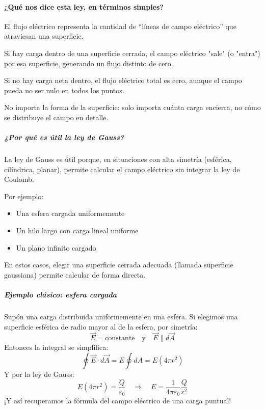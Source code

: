 \paragraph{¿Qué nos dice esta ley, en términos simples?}

El flujo eléctrico representa la cantidad de ``líneas de campo eléctrico'' que atraviesan una superficie.

Si hay carga dentro de una superficie cerrada, el campo eléctrico "sale" (o "entra") por esa superficie, generando un flujo distinto de cero.

Si no hay carga neta dentro, el flujo eléctrico total es cero, aunque el campo pueda no ser nulo en todos los puntos.

No importa la forma de la superficie: solo importa cuánta carga encierra, no cómo se distribuye el campo en detalle.

\subparagraph{¿Por qué es útil la ley de Gauss?}

La ley de Gauss es útil porque, en situaciones con alta simetría (esférica, cilíndrica, planar), permite calcular el campo eléctrico sin integrar la ley de Coulomb.

Por ejemplo:
\begin{itemize}
    \item Una esfera cargada uniformemente
    \item Un hilo largo con carga lineal uniforme
    \item Un plano infinito cargado
\end{itemize}

En estos casos, elegir una superficie cerrada adecuada (llamada superficie gaussiana) permite calcular  de forma directa.

\subparagraph{Ejemplo clásico: esfera cargada}

Supón una carga  distribuida uniformemente en una esfera. Si elegimos una superficie esférica de radio  mayor al de la esfera, por simetría:
\[
\vec{E} = \text{constante} \quad \text{y} \quad \vec{E} \parallel d\vec{A}
\]
Entonces la integral se simplifica:
\[
\oint \vec{E} \cdot d\vec{A} = E \oint dA = E(4\pi r^2)
\]
Y por la ley de Gauss:
\[
E(4\pi r^2) = \frac{Q}{\varepsilon_0} \quad \Rightarrow \quad E = \frac{1}{4\pi\varepsilon_0} \frac{Q}{r^2}
\]
¡Y así recuperamos la fórmula del campo eléctrico de una carga puntual!

